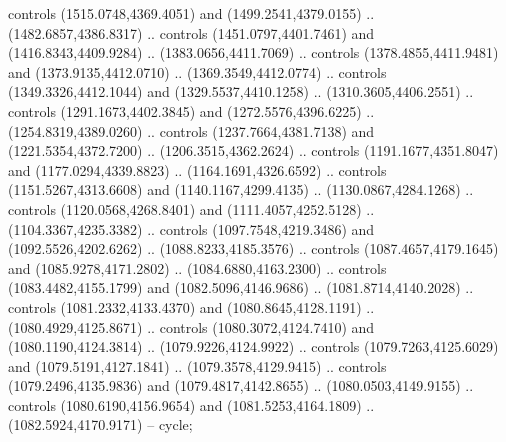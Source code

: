 \begin{scope}[shift={(-343.28256,-575.56596)}]
\begin{scope}[shift={(-736.04956,-3272.8657)}]
      controls (1515.0748,4369.4051) and (1499.2541,4379.0155) ..
      (1482.6857,4386.8317) .. controls (1451.0797,4401.7461) and
      (1416.8343,4409.9284) .. (1383.0656,4411.7069) .. controls
      (1378.4855,4411.9481) and (1373.9135,4412.0710) .. (1369.3549,4412.0774) ..
      controls (1349.3326,4412.1044) and (1329.5537,4410.1258) ..
      (1310.3605,4406.2551) .. controls (1291.1673,4402.3845) and
      (1272.5576,4396.6225) .. (1254.8319,4389.0260) .. controls
      (1237.7664,4381.7138) and (1221.5354,4372.7200) .. (1206.3515,4362.2624) ..
      controls (1191.1677,4351.8047) and (1177.0294,4339.8823) ..
      (1164.1691,4326.6592) .. controls (1151.5267,4313.6608) and
      (1140.1167,4299.4135) .. (1130.0867,4284.1268) .. controls
      (1120.0568,4268.8401) and (1111.4057,4252.5128) .. (1104.3367,4235.3382) ..
      controls (1097.7548,4219.3486) and (1092.5526,4202.6262) ..
      (1088.8233,4185.3576) .. controls (1087.4657,4179.1645) and
      (1085.9278,4171.2802) .. (1084.6880,4163.2300) .. controls
      (1083.4482,4155.1799) and (1082.5096,4146.9686) .. (1081.8714,4140.2028) ..
      controls (1081.2332,4133.4370) and (1080.8645,4128.1191) ..
      (1080.4929,4125.8671) .. controls (1080.3072,4124.7410) and
      (1080.1190,4124.3814) .. (1079.9226,4124.9922) .. controls
      (1079.7263,4125.6029) and (1079.5191,4127.1841) .. (1079.3578,4129.9415) ..
      controls (1079.2496,4135.9836) and (1079.4817,4142.8655) ..
      (1080.0503,4149.9155) .. controls (1080.6190,4156.9654) and
      (1081.5253,4164.1809) .. (1082.5924,4170.9171) -- cycle;


\end{scope}
\end{scope}
